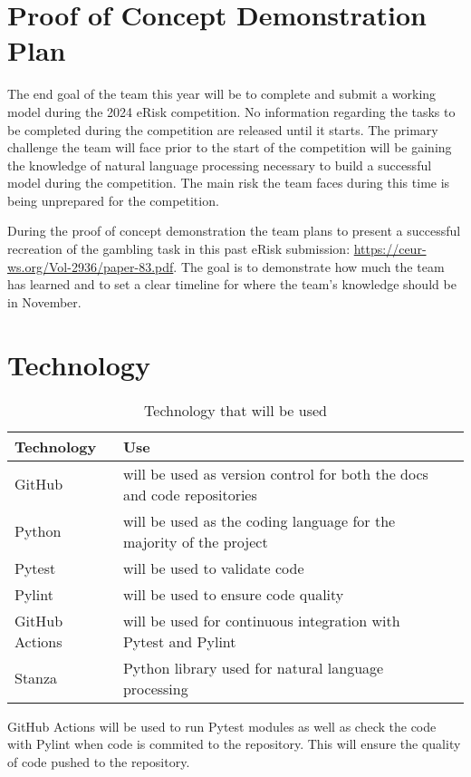 \documentclass{article}
\begin{document}
\section{Proof of Concept Demonstration Plan}

The end goal of the team this year will be to complete and submit a working model during the 2024 eRisk competition. No information regarding the tasks to be completed during the competition are released until it starts. The primary challenge the team will face prior to the start of the competition will be gaining the knowledge of natural language processing necessary to build a successful model during the competition. The main risk the team faces during this time is being unprepared for the competition.

During the proof of concept demonstration the team plans to present a successful recreation of the gambling task in this past eRisk submission: \url{https://ceur-ws.org/Vol-2936/paper-83.pdf}. The goal is to demonstrate how much the team has learned and to set a clear timeline for where the team's knowledge should be in November.

\section{Technology}

\begin{table}[hp]
	\caption{Technology that will be used} \label{TblTechnology}
	\begin{tabularx}{\textwidth}{llX}
	\toprule
	\textbf{Technology} & \textbf{Use}\\
	\midrule
	GitHub & will be used as version control for both the docs and code repositories\\
	Python & will be used as the coding language for the majority of the project\\
	Pytest & will be used to validate code\\
	Pylint & will be used to ensure code quality\\
	GitHub Actions & will be used for continuous integration with Pytest and Pylint\\
	Stanza & Python library used for natural language processing\\
	\bottomrule
	\end{tabularx}
\end{table}

GitHub Actions will be used to run Pytest modules as well as check the code with Pylint when code is commited to the repository.
This will ensure the quality of code pushed to the repository.
\end{document}

